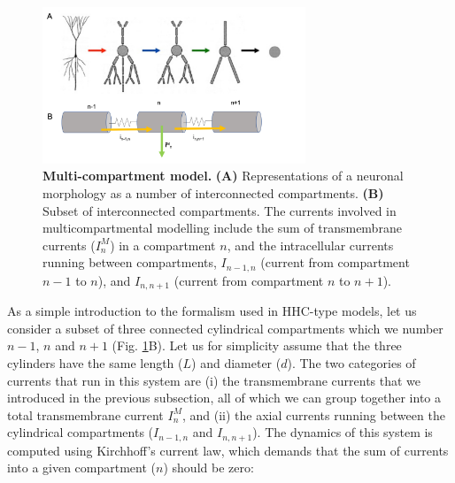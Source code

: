 \begin{figure}[!ht]
\begin{center}
\includegraphics[width=0.7\textwidth]{Figures/Neuron/Multikompis.png}
\end{center}
\caption{\textbf{Multi-compartment model.} {\bf (A)} Representations of a neuronal morphology as a number of interconnected compartments. {\bf (B)} Subset of interconnected compartments. The currents involved in multicompartmental modelling include the sum of transmembrane currents ($I^M_n$) in a compartment $n$, and the intracellular currents running between 
compartments, $I_{n-1,n}$ (current from compartment $n-1$ to $n$), and $I_{n,n+1}$ (current from compartment $n$ to $n+1$).}
\label{Neuron:fig:multikompisen}
\end{figure}

As a simple introduction to the formalism used in HHC-type models, let us consider a subset of three connected cylindrical compartments which we number $n-1$, $n$ and $n+1$ (Fig. \ref{Neuron:fig:multikompisen}B). Let us for simplicity assume that the three cylinders have the same length ($L$) and diameter ($d$). The two categories of currents that run in this system are (i) the transmembrane currents that we introduced in the previous subsection, all of which we can group together into a total transmembrane current $I^M_n$, and (ii) the axial currents running between the cylindrical compartments ($I_{n-1,n}$ and $I_{n,n+1}$). The dynamics of this system is computed using Kirchhoff's current law, which demands that the sum of currents into a given compartment ($n$) should be zero:


